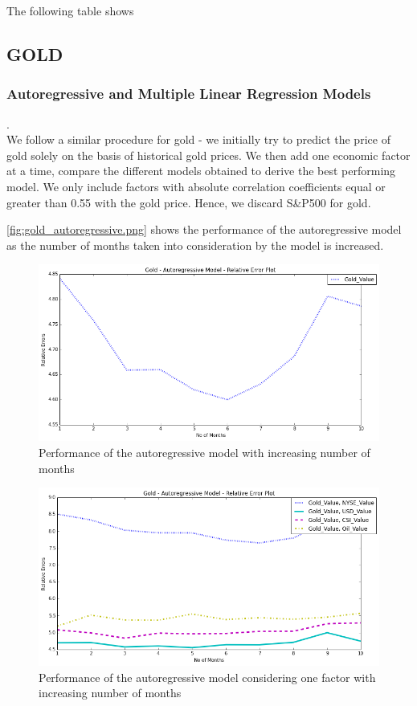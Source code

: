 \documentclass[runningheads]{llncs}
\begin{document}
The following table shows 
\newpage
\subsection {GOLD}

\subsubsection {Autoregressive and Multiple Linear Regression Models}.\\

We follow a similar procedure for gold - we initially try to predict the price of gold solely on the basis of historical gold prices. We then add one economic factor at a time, compare the different models obtained to derive the best performing model. We only include factors with absolute correlation coefficients equal or greater than 0.55 with the gold price. Hence, we discard S\&P500 for gold.


\noindent \autoref{fig:gold_autoregressive.png} shows the performance of the autoregressive model as the number of months taken into consideration by the model is increased. \\

\begin{figure}
\centering
\includegraphics[width=\textwidth]{gold_autoregressive.png}
\caption{Performance of the autoregressive model with increasing number of months}
\label{fig:gold_autoregressive.png}
\end{figure}

\begin{figure}
\centering
\includegraphics[width=\textwidth]{gold_autoregressive_1factor_10.png}
\caption{Performance of the autoregressive model considering one factor with increasing number of months}
\label{fig:gold_autoregressive_1factor_10.png}
\end{figure}
\end{document}
